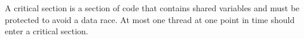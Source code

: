 A critical section is a section of code that contains shared variables and must be protected to avoid a data race. At most one thread at one point in time should enter a critical section.